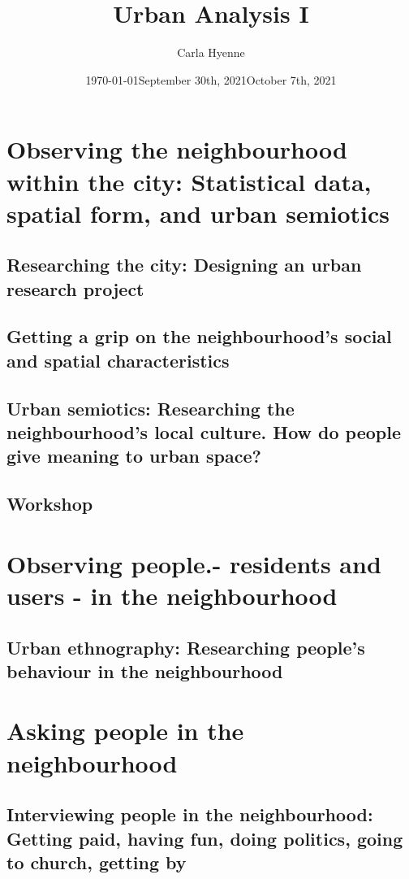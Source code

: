 \documentclass{article}
\title{Urban Analysis I}
\author{Carla Hyenne }
\date{\today}
\begin{document}
\maketitle

\tableofcontents

\pagebreak

\section{Observing the neighbourhood within the city: Statistical data, spatial form, and urban semiotics}

\subsection{Researching the city: Designing an urban research project}
\date{September 30th, 2021}

\subsection{Getting a grip on the neighbourhood's social and spatial characteristics}
\date{October 7th, 2021}

\subsection{Urban semiotics: Researching the neighbourhood's local culture. How do people give meaning to urban space?}

\subsection{Workshop}

\section{Observing people.- residents and users - in the neighbourhood}

\subsection{Urban ethnography: Researching people's behaviour in the neighbourhood}

\section{Asking people in the neighbourhood}

\subsection{Interviewing people in the neighbourhood: Getting paid, having fun, doing politics, going to church, getting by}
\end{document}
